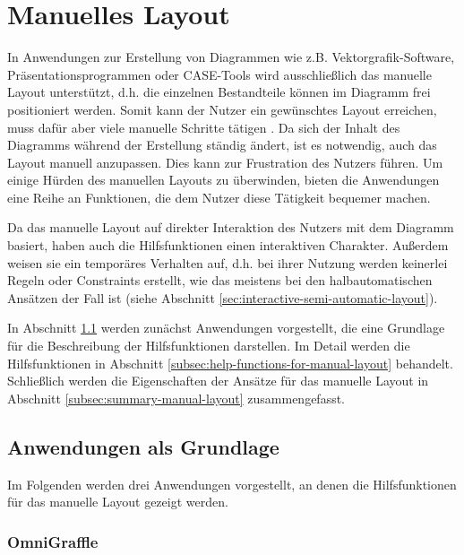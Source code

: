 \section{Manuelles Layout}
\label{sec:manual-layout}

In Anwendungen zur Erstellung von Diagrammen wie z.B. Vektorgrafik-Software, Präsentationsprogrammen oder CASE-Tools wird ausschließlich das manuelle Layout unterstützt, d.h. die einzelnen Bestandteile können im Diagramm frei positioniert werden. Somit kann der Nutzer ein gewünschtes Layout erreichen, muss dafür aber viele manuelle Schritte tätigen \cite{Eichelberger05Aesthetics}. Da sich der Inhalt des Diagramms während der Erstellung ständig ändert, ist es notwendig, auch das Layout manuell anzupassen. Dies kann zur Frustration des Nutzers führen. Um einige Hürden des manuellen Layouts zu überwinden, bieten die Anwendungen eine Reihe an Funktionen, die dem Nutzer diese Tätigkeit bequemer machen.

Da das manuelle Layout auf direkter Interaktion des Nutzers mit dem Diagramm basiert, haben auch die Hilfsfunktionen einen interaktiven Charakter. Außerdem weisen sie ein temporäres Verhalten auf, d.h. bei ihrer Nutzung werden keinerlei Regeln oder Constraints erstellt, wie das meistens bei den halbautomatischen Ansätzen der Fall ist (siehe Abschnitt \ref{sec:interactive-semi-automatic-layout}).

In Abschnitt \ref{subsec:applications-for-manual-layout} werden zunächst Anwendungen vorgestellt, die eine Grundlage für die Beschreibung der Hilfsfunktionen darstellen. Im Detail werden die Hilfsfunktionen in Abschnitt \ref{subsec:help-functions-for-manual-layout} behandelt. Schließlich werden die Eigenschaften der Ansätze für das manuelle Layout in Abschnitt \ref{subsec:summary-manual-layout} zusammengefasst.

\subsection{Anwendungen als Grundlage}
\label{subsec:applications-for-manual-layout}

Im Folgenden werden drei Anwendungen vorgestellt, an denen die Hilfsfunktionen für das manuelle Layout gezeigt werden.

\subsubsection{OmniGraffle}
\label{subsubsec:omnigraffle}

